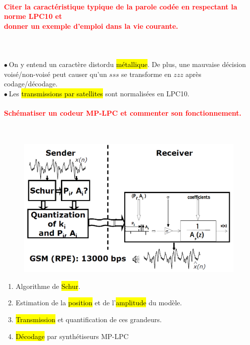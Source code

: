 \documentclass[letterpaper, 12pt]{article}
\newcommand{\alinea}{
\hspace*{0.3cm}}
\newcommand{\red}[1]{
	\textcolor{red}{#1}
}
\newcommand{\point}{$\bullet\ $}
\begin{document}
		\paragraph{\red{Citer la caractéristique typique de la parole codée en respectant la norme LPC10 et 
		~\\ \hspace*{0.035cm} donner un exemple d'emploi dans la vie courante.}}~\\~\\
			\point On y entend un caractère distordu\hl{ m\'etallique}. De plus, une mauvaise d\'ecision 
				\\\alinea vois\'e/non-vois\'e peut causer qu'un $sss$ se transforme en $zzz$ après codage/décodage.\\
			\point Les \hl{transmissions par satellites} sont normalisées en LPC10.
			
		\paragraph{\red{Schématiser un codeur MP-LPC et commenter son fonctionnement.}}~\\
			\begin{minipage}{0.55\textwidth}
				\begin{figure}[H]
					\centering
					\includegraphics[scale=0.35]{Images/coder-mplpc}
				\end{figure}\noindent
			\end{minipage}\hfill
			\begin{minipage}{0.4\textwidth}
				\begin{enumerate}
					\setlength{\itemsep}{0pt}		
					\setlength{\parskip}{0pt}		
					\setlength{\parsep}{0pt}	
					\item Algorithme de \hl{Schur}.
					\item Estimation de la \hl{position} et de l'\hl{amplitude} du modèle.
					\item \hl{Transmission} et quantification de ces grandeurs.
					\item \hl{D\'ecodage} par synthétiseurs MP-LPC
				\end{enumerate}
			\end{minipage}
\end{document}

